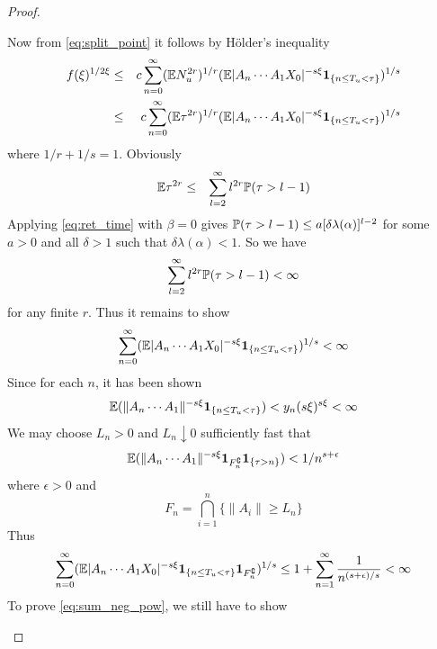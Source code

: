 \documentclass[aoas,preprint]{imsart}
\numberwithin{equation}{section}
\theoremstyle{plain}
\begin{document}
\begin{proof}
\begin{enumerate}
    Now from \eqref{eq:split_point} it follows by H\"older's inequality
    \begin{eqnarray*}
      f(\xi)^{1/2\xi}
      &\leq&
      c \sum_{n=0}^\infty
      (\E N_u^{2r})^{1/r}
      (\E |A_n \cdots A_1 X_0|^{-s\xi}\1{n \leq T_u < \tau})^{1/s} \\
      &\leq&
      c \sum_{n=0}^\infty
      (\E\tau^{2r})^{1/r}
      (\E |A_n \cdots A_1 X_0|^{-s\xi}\1{n \leq T_u < \tau})^{1/s}
    \end{eqnarray*}
    where $1/r + 1/s = 1$. Obviously
    \begin{eqnarray*}
      \E \tau^{2r}
      &\leq&
      \sum_{l=2}^\infty l^{2r} \P(\tau > l-1)
    \end{eqnarray*}
    Applying \eqref{eq:ret_time} with $\beta = 0$ gives $\P(\tau >
    l-1) \leq a [\delta \lambda(\alpha)]^{l-2}$ for some $a > 0$ and
    all $\delta > 1$ such that $\delta \lambda(\alpha) < 1$. So we
    have
    \begin{eqnarray*}
      \sum_{l=2}^\infty l^{2r} \P(\tau > l-1) < \infty
    \end{eqnarray*}
    for any finite $r$. Thus it remains to show
    \begin{equation}
      \label{eq:sum_neg_pow}
      \sum_{n=0}^\infty
      (\E |A_n \cdots A_1 X_0|^{-s\xi}\1{n \leq T_u < \tau})^{1/s}
      < \infty
    \end{equation}
    Since for each $n$, it has been shown
    \begin{equation*}
      \E (\|A_n \cdots A_1\|^{-s\xi}\1{n \leq T_u < \tau})
      < y_n(s\xi)^{s\xi} < \infty
    \end{equation*}
    We may choose $L_n > 0$ and $L_n \downarrow 0$ sufficiently fast that
    \begin{equation*}
      \E (
      \|A_n \cdots A_1\|^{-s\xi}
      \I_{F_n^\complement}
      \1{\tau > n} 
      ) < {1 / n^{s+\epsilon}}
    \end{equation*}
    where $\epsilon > 0$ and
    \begin{equation*}
      F_n = \bigcap_{i=1}^n \{\|A_i\| \geq L_n\}
    \end{equation*}
    Thus
    \begin{equation*}
      \sum_{n=0}^\infty
      (\E |A_n \cdots A_1 X_0|^{-s\xi}\1{n \leq T_u < \tau}
      \I_{F_n^\complement})^{1/s}
      \leq
      1 + 
      \sum_{n=1}^\infty {1 \over n^{(s + \epsilon)/s}} < \infty
    \end{equation*}
    To prove \eqref{eq:sum_neg_pow}, we still have to show

\end{enumerate}
\end{proof}
\end{document}
